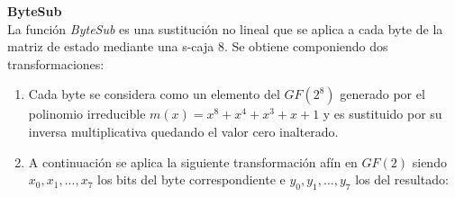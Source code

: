 \begin{description}
	\item \textbf{ByteSub}\\
		La función \emph{ByteSub} es una sustitución no lineal que se aplica a cada byte de la matriz de estado mediante una s-caja 8. Se obtiene componiendo dos transformaciones:
		\begin{enumerate}
			\item Cada byte se considera como un elemento del $GF(2^8)$ generado por el polinomio irreducible $m(x)=x^8+x^4+x^3+x+1$ y es sustituido por su inversa multiplicativa quedando el valor cero inalterado. 
			\item A continuación se aplica la siguiente transformación afín en $GF(2)$ siendo $x_0, x_1,...,x_7$ los bits del byte correspondiente e $y_0, y_1,...,y_7$ los del resultado:


\end{enumerate}
\end{description}
